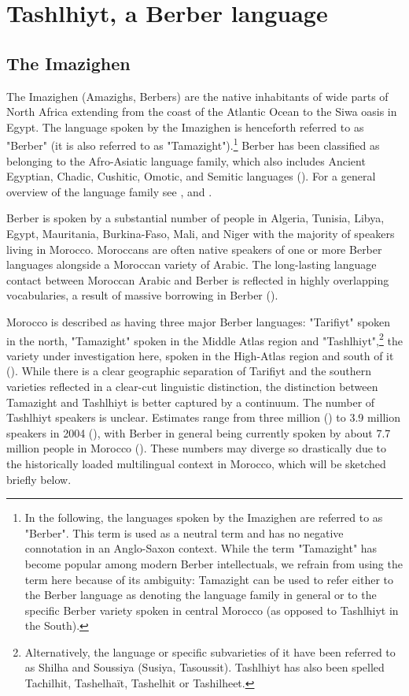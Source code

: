 \chapter{Tashlhiyt, a Berber language}
\section{The Imazighen}
The Imazighen (Amazighs, Berbers) are the native inhabitants of wide parts of North Africa extending from the coast of the Atlantic Ocean to the Siwa oasis in Egypt. The language spoken by the Imazighen is henceforth referred to as "Berber" (it is also referred to as "Tamazight").\footnote{In the following, the languages spoken by the Imazighen are referred to as "Berber". This term is used as a neutral term and has no negative connotation in an Anglo-Saxon context. While the term "Tamazight" has become popular among modern Berber intellectuals, we refrain from using the term here because of its ambiguity: Tamazight can be used to refer either to the Berber language as denoting the language family in general or to the specific Berber variety spoken in central Morocco (as opposed to Tashlhiyt in the South).} Berber has been classified as belonging to the Afro-Asiatic language family, which also includes Ancient Egyptian, Chadic, Cushitic, Omotic, and Semitic languages (\citealt{Ethnologue2016}). For a general overview of the language family see \citet{Basset1952}, \citet{Applegate1971} and \citet{Galand1988}.

Berber is spoken by a substantial number of people in Algeria, Tunisia, Libya, Egypt, Mauritania, Burkina-Faso, Mali, and Niger with the majority of speakers living in Morocco. Moroccans are often native speakers of one or more Berber languages alongside a Moroccan variety of Arabic. The long-lasting language contact between Moroccan Arabic and Berber is reflected in highly overlapping vocabularies, a result of massive borrowing in Berber (\citealt{Kossmann2009}).

Morocco is described as having three major Berber languages: "Tarifiyt"  spoken in the north, "Tamazight"  spoken in the Middle Atlas region and "Tashlhiyt",\footnote{Alternatively, the language or specific subvarieties of it have been referred to as Shilha and Soussiya (Susiya, Tasoussit). Tashlhiyt has also been spelled Tachilhit, Tashelhaït, Tashelhit or Tashilheet.} the variety under investigation here, spoken in the High-Atlas region and south of it (). While there is a clear geographic separation of Tarifiyt and the southern varieties reflected in a clear-cut linguistic distinction, the distinction between Tamazight and Tashlhiyt is better captured by a continuum. The number of Tashlhiyt speakers is unclear. Estimates range from three million (\citealt{Chaker1992}) to 3.9 million speakers in 2004 (\citealt{Ethnologue2016}), with Berber in general being currently spoken by about 7.7 million people in Morocco  (\citealt{Ethnologue2016}). These numbers may diverge so drastically due to the historically loaded multilingual context in Morocco, which will be sketched briefly below.


